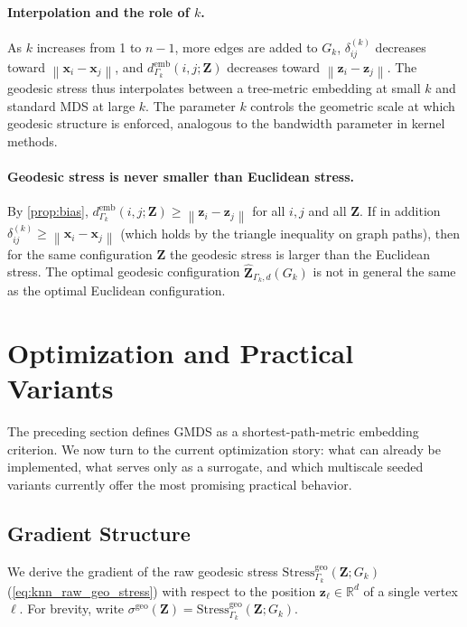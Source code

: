 \documentclass[twoside,11pt]{article}
\newcommand{\R}{\mathbb{R}}
\newcommand{\bx}{\mathbf{x}}
\newcommand{\bz}{\mathbf{z}}
\newcommand{\bZ}{\mathbf{Z}}
\newcommand{\norm}[1]{\left\|#1\right\|}
\newcommand{\demb}{d^{\mathrm{emb}}}
\newcommand{\Gk}{G_k}
\newcommand{\Stress}{\mathrm{Stress}}
\begin{document}
\paragraph{Interpolation and the role of $k$.}
As $k$ increases from 1 to $n-1$, more edges are added to $\Gk$,
$\delta^{(k)}_{ij}$ decreases toward $\norm{\bx_i - \bx_j}$, and
$\demb_{\Gamma_k}(i,j;\bZ)$ decreases toward $\norm{\bz_i - \bz_j}$.  The
geodesic stress thus interpolates between a tree-metric embedding at small
$k$ and standard MDS at large $k$.  The parameter $k$ controls the
geometric scale at which geodesic structure is enforced, analogous to the
bandwidth parameter in kernel methods.

\paragraph{Geodesic stress is never smaller than Euclidean stress.}
By \cref{prop:bias}, $\demb_{\Gamma_k}(i,j;\bZ) \geq \norm{\bz_i - \bz_j}$
for all $i,j$ and all $\bZ$.  If in addition $\delta^{(k)}_{ij} \geq
\norm{\bx_i - \bx_j}$ (which holds by the triangle inequality on graph
paths), then for the same configuration $\bZ$ the geodesic stress is
larger than the Euclidean stress.  The optimal geodesic configuration
$\hat{\bZ}_{\Gamma_k,d}(\Gk)$ is not in general the same as the optimal
Euclidean configuration.

\section{Optimization and Practical Variants}
\label{sec:optimization_v4}

The preceding section defines GMDS as a shortest-path-metric embedding
criterion.  We now turn to the current optimization story: what can already be
implemented, what serves only as a surrogate, and which multiscale seeded
variants currently offer the most promising practical behavior.

\subsection{Gradient Structure}
\label{sec:gradient}

We derive the gradient of the raw geodesic stress
$\Stress^{\mathrm{geo}}_{\Gamma_k}(\bZ; \Gk)$
(\cref{eq:knn_raw_geo_stress}) with respect to the position
$\bz_\ell \in \R^d$ of a single vertex $\ell$.  For brevity, write
$\sigma^{\mathrm{geo}}(\bZ) = \Stress^{\mathrm{geo}}_{\Gamma_k}(\bZ; \Gk)$.
\end{document}
